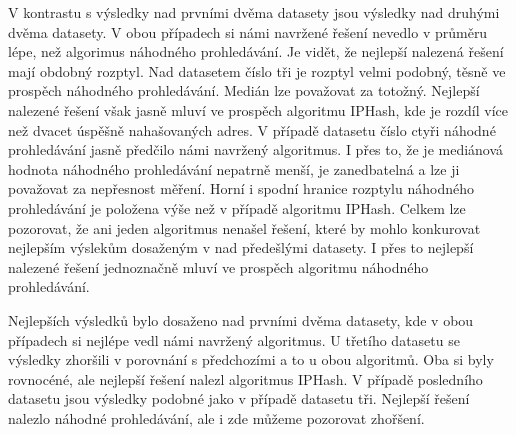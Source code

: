 V kontrastu s výsledky nad prvními dvěma datasety jsou výsledky nad druhými dvěma datasety. V obou případech
si námi navržené řešení nevedlo v průměru lépe, než algorimus náhodného prohledávání. Je vidět, že nejlepší
nalezená řešení mají obdobný rozptyl. Nad datasetem číslo tři je rozptyl velmi podobný, těsně ve prospěch 
náhodného prohledávání. Medián lze považovat za totožný. Nejlepší nalezené řešení však jasně mluví ve prospěch
algoritmu IPHash, kde je rozdíl více než dvacet úspěšně nahašovaných adres. V případě datasetu číslo ctyři náhodné
prohledávání jasně předčilo námi navržený algoritmus. I přes to, že je mediánová hodnota náhodného prohledávání
nepatrně menší, je zanedbatelná a lze ji považovat za nepřesnost měření. Horní i spodní hranice rozptylu náhodného
prohledávání je položena výše než v případě algoritmu IPHash. Celkem lze pozorovat, že ani jeden algoritmus 
nenašel řešení, které by mohlo konkurovat nejlepším výslekům dosaženým v nad předešlými datasety. I přes to
nejlepší nalezené řešení jednoznačně mluví ve prospěch algoritmu náhodného prohledávání.

Nejlepších výsledků bylo dosaženo nad prvními dvěma datasety, kde v obou případech si nejlépe vedl námi navržený
algoritmus. U třetího datasetu se výsledky zhoršili v porovnání s předchozími a to u obou algoritmů. Oba si byly 
rovnocéné, ale nejlepší řešení nalezl algoritmus IPHash. V případě posledního datasetu jsou výsledky podobné jako
v případě datasetu tři. Nejlepší řešení nalezlo náhodné prohledávání, ale i zde můžeme pozorovat zhořšení. 

